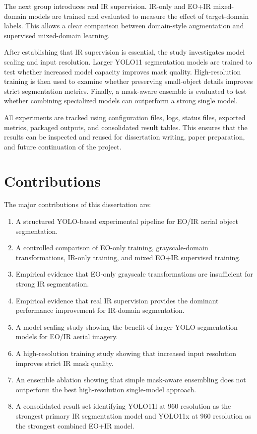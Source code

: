The next group introduces real IR supervision. IR-only and EO+IR mixed-domain models are trained and evaluated to measure the effect of target-domain labels. This allows a clear comparison between domain-style augmentation and supervised mixed-domain learning.

After establishing that IR supervision is essential, the study investigates model scaling and input resolution. Larger YOLO11 segmentation models are trained to test whether increased model capacity improves mask quality. High-resolution training is then used to examine whether preserving small-object details improves strict segmentation metrics. Finally, a mask-aware ensemble is evaluated to test whether combining specialized models can outperform a strong single model.

All experiments are tracked using configuration files, logs, status files, exported metrics, packaged outputs, and consolidated result tables. This ensures that the results can be inspected and reused for dissertation writing, paper preparation, and future continuation of the project.

\section{Contributions}

The major contributions of this dissertation are:

\begin{enumerate}
    \item A structured YOLO-based experimental pipeline for EO/IR aerial object segmentation.
    \item A controlled comparison of EO-only training, grayscale-domain transformations, IR-only training, and mixed EO+IR supervised training.
    \item Empirical evidence that EO-only grayscale transformations are insufficient for strong IR segmentation.
    \item Empirical evidence that real IR supervision provides the dominant performance improvement for IR-domain segmentation.
    \item A model scaling study showing the benefit of larger YOLO segmentation models for EO/IR aerial imagery.
    \item A high-resolution training study showing that increased input resolution improves strict IR mask quality.
    \item An ensemble ablation showing that simple mask-aware ensembling does not outperform the best high-resolution single-model approach.
    \item A consolidated result set identifying YOLO11l at 960 resolution as the strongest primary IR segmentation model and YOLO11x at 960 resolution as the strongest combined EO+IR model.
\end{enumerate}

